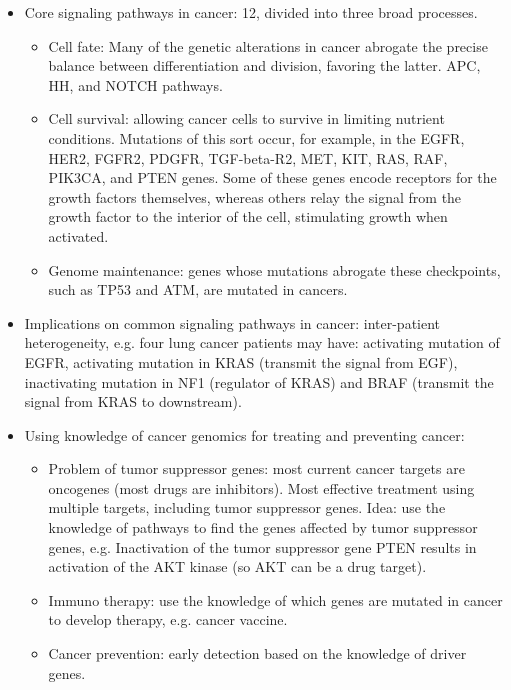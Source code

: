 \documentclass{report}
\begin{document}
\begin{itemize}
	\item Core signaling pathways in cancer: 12, divided into three broad processes. 
	\begin{itemize}
		\item Cell fate: Many of the genetic alterations in cancer abrogate the precise balance between differentiation and division, favoring the latter. APC, HH, and NOTCH pathways. 
		\item Cell survival: allowing cancer cells to survive in limiting nutrient conditions. Mutations of this sort occur, for example, in the EGFR, HER2, FGFR2, PDGFR, TGF-beta-R2, MET, KIT, RAS, RAF, PIK3CA, and PTEN genes. Some of these genes encode receptors for the growth factors themselves, whereas others relay the signal from the growth factor to the interior of the cell, stimulating growth when activated. 
		\item Genome maintenance: genes whose mutations abrogate these checkpoints, such as TP53 and ATM, are mutated in cancers. 
	\end{itemize}
	
	\item Implications on common signaling pathways in cancer: inter-patient heterogeneity, e.g. four lung cancer patients may have: activating mutation of EGFR, activating mutation in KRAS (transmit the signal from EGF), inactivating mutation in NF1 (regulator of KRAS) and BRAF (transmit the signal from KRAS to downstream). 
	
	\item Using knowledge of cancer genomics for treating and preventing cancer: 
	\begin{itemize}
		\item Problem of tumor suppressor genes: most current cancer targets are oncogenes (most drugs are inhibitors). Most effective treatment using multiple targets, including tumor suppressor genes. Idea: use the knowledge of pathways to find the genes affected by tumor suppressor genes, e.g. Inactivation of the tumor suppressor gene PTEN results in activation of the AKT kinase (so AKT can be a drug target). 
		\item Immuno therapy: use the knowledge of which genes are mutated in cancer to develop therapy, e.g. cancer vaccine. 
		\item Cancer prevention: early detection based on the knowledge of driver genes. 
	\end{itemize}
	
\end{itemize}
\end{document}
